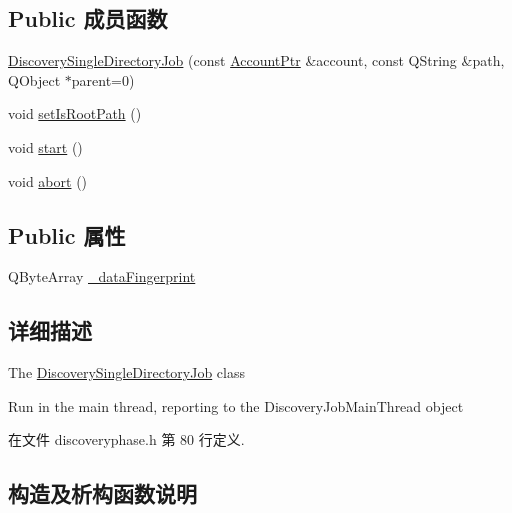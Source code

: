 \subsection*{Public 成员函数}
\begin{DoxyCompactItemize}
\item 
\hyperlink{class_o_c_c_1_1_discovery_single_directory_job_a0fb291d839a53093525e15fdf6e124e7}{Discovery\+Single\+Directory\+Job} (const \hyperlink{namespace_o_c_c_a848616aedb9188e223c6b9867757fe69}{Account\+Ptr} \&account, const Q\+String \&path, Q\+Object $\ast$parent=0)
\item 
void \hyperlink{class_o_c_c_1_1_discovery_single_directory_job_a7ed7449b811677c02711f86b7a8604f5}{set\+Is\+Root\+Path} ()
\item 
void \hyperlink{class_o_c_c_1_1_discovery_single_directory_job_a342341cabb7c8571b81905c5fb6e8280}{start} ()
\item 
void \hyperlink{class_o_c_c_1_1_discovery_single_directory_job_ac3067dbaea04e836957f171f9ae00582}{abort} ()
\end{DoxyCompactItemize}
\subsection*{Public 属性}
\begin{DoxyCompactItemize}
\item 
Q\+Byte\+Array \hyperlink{class_o_c_c_1_1_discovery_single_directory_job_a37c8359d97079c8b6cca3c0339a8b97c}{\+\_\+data\+Fingerprint}
\end{DoxyCompactItemize}


\subsection{详细描述}
The \hyperlink{class_o_c_c_1_1_discovery_single_directory_job}{Discovery\+Single\+Directory\+Job} class 

Run in the main thread, reporting to the Discovery\+Job\+Main\+Thread object 

在文件 discoveryphase.\+h 第 80 行定义.



\subsection{构造及析构函数说明}
\mbox{\label{class_o_c_c_1_1_discovery_single_directory_job_a0fb291d839a53093525e15fdf6e124e7}} 
